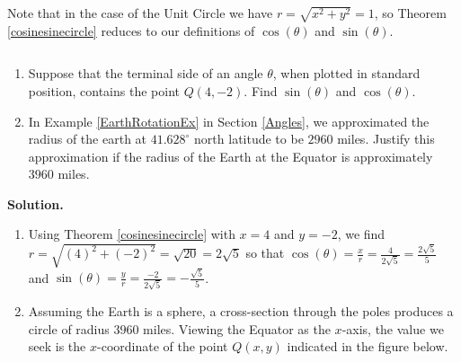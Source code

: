 Note that in the case of the Unit Circle we have $r = \sqrt{x^2+y^2} = 1$, so Theorem \ref{cosinesinecircle} reduces to our definitions of $\cos(\theta)$ and $\sin(\theta)$.

\begin{ex} \label{cosinesinecircleex}  $~$
\begin{enumerate}

\item  Suppose that the terminal side of an angle $\theta$, when plotted in standard position,  contains the point $Q(4,-2)$.  Find $\sin(\theta)$ and $\cos(\theta)$.

\item In Example \ref{EarthRotationEx} in Section \ref{Angles}, we approximated the radius of the earth at  $41.628^{\circ}$ north latitude to be $2960$ miles. Justify this approximation if the radius of the Earth at the Equator is approximately $3960$ miles.  

\end{enumerate}

{\bf Solution.}

\begin{enumerate}

\item  Using Theorem \ref{cosinesinecircle} with $x = 4$ and $y = -2$, we find $r = \sqrt{(4)^2 + (-2)^2} = \sqrt{20} = 2 \sqrt{5}$ so that $\cos(\theta) = \frac{x}{r} =  \frac{4}{2 \sqrt{5}} = \frac{2 \sqrt{5}}{5}$ and $\sin(\theta) = \frac{y}{r} =  \frac{-2}{2 \sqrt{5}} = -\frac{\sqrt{5}}{5}$.

\item  Assuming the Earth is a sphere, a cross-section through the poles produces a circle of radius $3960$ miles.  Viewing the Equator as the $x$-axis, the value we seek is the $x$-coordinate of the point $Q(x,y)$ indicated in the figure below. 
 

\end{enumerate}
\end{ex}
